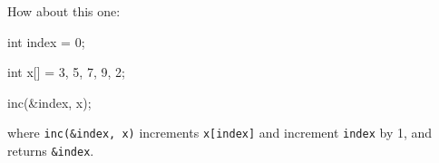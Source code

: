 How about this one:



\begin{consolethree}[escapeinside=||]

int index = 0;



int x[] = {3, 5, 7, 9, 2};



inc(&index, x); 

\end{consolethree}

where \texttt{inc(\&index, x)} increments \texttt{x[index]} and increment \texttt{index} by 1, and returns \texttt{\&index}.

